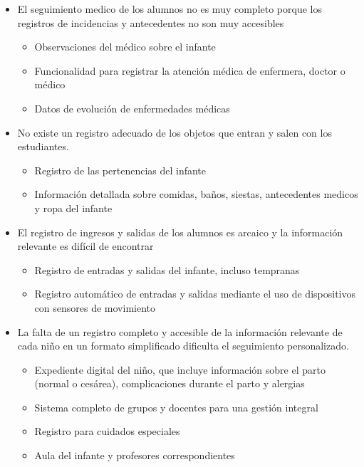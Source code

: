 \documentclass{article}
\begin{document}
\begin{itemize}

	\item El seguimiento medico de los alumnos no es muy completo porque los registros de  incidencias y antecedentes no son muy accesibles
	      \begin{itemize}
		      \item Observaciones del médico sobre el infante
		      \item Funcionalidad para registrar la atención médica de enfermera, doctor o médico
		      \item Datos de evolución de enfermedades médicas
	      \end{itemize}

	\item No existe un registro adecuado de los objetos que entran y salen con los estudiantes.
	      \begin{itemize}
		      \item Registro de las pertenencias del infante
		      \item Información detallada sobre comidas, baños, siestas, antecedentes medicos y ropa del infante
	      \end{itemize}

	\item El registro de ingresos y salidas de los alumnos es arcaico y la información relevante es difícil de encontrar
	      \begin{itemize}
		      \item Registro de entradas y salidas del infante, incluso tempranas
		      \item Registro automático de entradas y salidas mediante el uso de dispositivos con sensores de movimiento
	      \end{itemize}

	\item La falta de un registro completo y accesible de la información relevante de cada niño en un formato simplificado dificulta el seguimiento personalizado.
	      \begin{itemize}
		      \item Expediente digital del niño, que incluye información sobre el parto (normal o cesárea), complicaciones durante el parto y alergias
		      \item Sistema completo de grupos y docentes para una gestión integral
		      \item Registro para cuidados especiales
		      \item Aula del infante y profesores correspondientes
	      \end{itemize}


\end{itemize}
\end{document}
